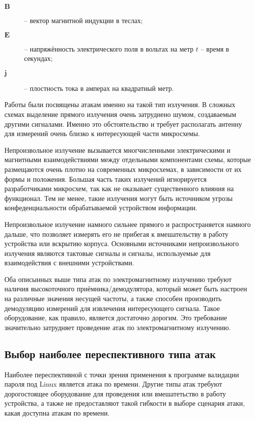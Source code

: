 \begin{description} 
\item[$\mathbf{B}$] -- вектор магнитной индукции в теслах;
\item[$\mathbf{E}$] -- напряжённость электрического поля в вольтах на метр $t$ -- время в секундах;
\item[$\mathbf{j}$] -- плостность тока в амперах на квадратный метр.
\end{description}

Работы \cite{ema1} \cite{ema2} были посвящены атакам именно на такой тип
излучения. В сложных схемах выделение прямого излучения очень затруднено шумом,
создаваемым другими сигналами. Именно это обстоятельство и требует располагать
антенну для измерений очень близко к интересующей части микросхемы.

Непроизвольное излучение вызывается многчисленными электрическими и магнитными
взаимодействиями между отдельными компонентами схемы, которые размещаются очень
плотно на современных микросхемах, в зависимости от их формы и положения.
Большая часть таких излучений игнорируется разработчиками микросхем, так как не
оказывает существенного влияния на функционал. Тем не менее, такие излучения
могут быть источником угрозы конфеденциальности обрабатываемой устройством
информации.

Непроизвольное излучение намного сильнее прямого и распространяется намного
дальше, что позволяет измерять его не прибегая к вмешательству в работу
устройства или вскрытию корпуса. Основными источниками непроизвольного
излучения являются тактовые сигналы и сигналы, используемые для взаимодействия
с внешними устройствами.

Оба описынных выше типа атак по электромагнитному излучению требуют наличия
высокоточного приёмника/демодулятора, который может быть настроен на различные
значения несущей частоты, а также способен производить демодуляцию измерений
для извлечения интересующего сигнала. Такое оборудование, как правило, является
достаточно дорогим. Это требование значительно затрудняет проведение атак по
электромагнитному излучению.

\subsection{Выбор наиболее переспективного типа атак}

Наиболее переспективной с точки зрения применения к программе
валидации пароля под Linux является атака по времени. Другие типы атак требуют
дорогостоящее оборудование для проведения или вмешатетьство в работу устройства,
а также не предоставляют такой гибкости в выборе сценария атаки, какая доступна
атакам по времени.

\clearpage
